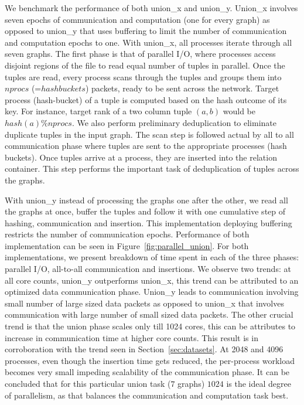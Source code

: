 We benchmark the performance of both union\_x and union\_y. Union\_x involves seven epochs of communication and computation (one for every graph) as opposed to union\_y that uses buffering to limit the number of communication and computation epochs to one. With union\_x, all processes iterate through all seven graphs. The first phase is that of parallel I/O, where processes access disjoint regions of the file to read equal number of tuples in parallel. Once the tuples are read, every process scans through the tuples and groups them into $nprocs$ (=$hashbuckets$) packets, ready to be sent across the network.
Target process (hash-bucket) of a tuple is computed based on the hash outcome of its key. For instance, target rank of a two column tuple $(a, b)$ would be $hash(a)\%nprocs$. We also perform preliminary deduplication to eliminate duplicate tuples in the input graph. The scan step is followed actual by all to all communication phase where tuples are sent to the appropriate processes (hash buckets). Once tuples arrive at a process, they are inserted into the relation container. This step performs the important task of deduplication of tuples across the graphs. 

With union\_y instead of processing the graphs one after the other, we read all the graphs at once, buffer the tuples and follow it with one cumulative step of hashing, communication and insertion. This implementation deploying buffering restricts the number of communication epochs. Performance of both implementation can be seen in Figure~\ref{fig:parallel_union}. For both implementations, we present breakdown of time spent in each of the three phases: parallel I/O, all-to-all communication and insertions. We observe two trends: at all core counts, union\_y outperforms union\_x, this trend can be attributed to an optimized data communication phase. Union\_y leads to communication involving small number of large sized data packets as opposed to union\_x that involves communication with large number of small sized data packets. The other crucial trend is that the union phase scales only till 1024 cores, this can be attributes to increase in communication time at higher core counts. This result is in corroboration with the trend seen in Section~\ref{sec:datasets}. At 2048 and 4096 processes, even though the insertion time gets reduced, the per-process workload becomes very small impeding scalability of the communication phase. It can be concluded that for this particular union task ($7$ graphs) $1024$ is the ideal degree of parallelism, as that balances the communication and computation task best.

